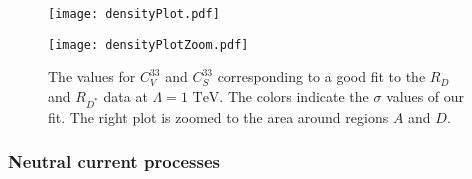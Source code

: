 \begin{figure}[t]
  \centering
  \begin{minipage}[t]{0.45\linewidth}
    \centering \texttt{[image: densityPlot.pdf]}
  \end{minipage}
  \hfill
  \begin{minipage}[t]{0.45\linewidth}
    \centering \texttt{[image: densityPlotZoom.pdf]}
  \end{minipage}
  \caption[The values for $C_V^{33}$ and $C_S^{33}$ corresponding to a good fit
  to the $R_D$ and $R_{D^*}$ data at $\Lambda = 1 \text{ TeV}$.]{The values for
    $C_V^{33}$ and $C_S^{33}$ corresponding to a good fit to the $R_D$ and
    $R_{D^*}$ data at $\Lambda = 1 \text{ TeV}$. The colors indicate the
    $\sigma$ values of our fit. The right plot is zoomed to the area around
    regions $A$ and $D$.}
  \label{fig:ch3-rdrdstarregions}
\end{figure}

\subsubsection{Neutral current processes}
\label{sec:ch3-neutralcurrentprocesses}

